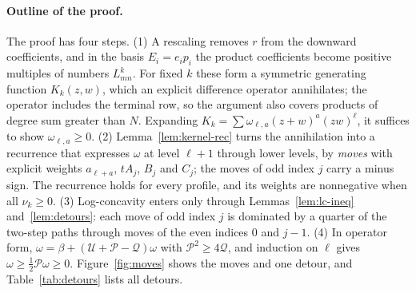 \paragraph{Outline of the proof.}
The proof has four steps. (1) A rescaling removes $r$ from the downward coefficients, and in the basis $E_i=e_ip_i$ the product coefficients become positive multiples of numbers $L_{mn}^k$. For fixed $k$ these form a symmetric generating function $K_k(z,w)$, which an explicit difference operator annihilates; the operator includes the terminal row, so the argument also covers products of degree sum greater than $N$. Expanding $K_k=\sum\omega_{\ell,a}(z+w)^a(zw)^\ell$, it suffices to show $\omega_{\ell,a}\geq0$. (2) Lemma~\ref{lem:kernel-rec} turns the annihilation into a recurrence that expresses $\omega$ at level $\ell+1$ through lower levels, by \emph{moves} with explicit weights $a_{\ell+a}$, $tA_j$, $B_j$ and $C_j$; the moves of odd index $j$ carry a minus sign. The recurrence holds for every profile, and its weights are nonnegative when all $\nu_k\geq0$. (3) Log-concavity enters only through Lemmas~\ref{lem:lc-ineq} and~\ref{lem:detours}: each move of odd index $j$ is dominated by a quarter of the two-step paths through moves of the even indices $0$ and $j-1$. (4) In operator form, $\omega=\beta+(\mathcal U+\mathcal P-\mathcal Q)\omega$ with $\mathcal P^2\geq4\mathcal Q$, and induction on $\ell$ gives $\omega\geq\frac12\mathcal P\omega\geq0$. Figure~\ref{fig:moves} shows the moves and one detour, and Table~\ref{tab:detours} lists all detours.

